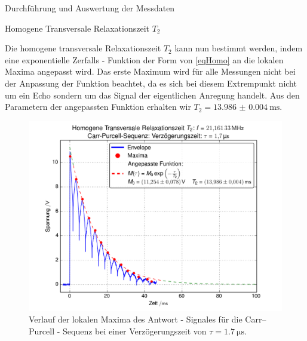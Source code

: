 \documentclass[pdftex, a4paper,11pt, twoside, ngerman]{report}
\begin{document}
\begin{chapter}{Durchführung und Auswertung der Messdaten}
\begin{section}{
        Homogene Transversale Relaxationszeit $T_{2}$}
\begin{subsection}
        Die homogene transversale Relaxationszeit $T_{2}$ kann nun bestimmt
        werden, indem eine exponentielle Zerfalls - Funktion der Form
        von \cref{eqHomo} an die lokalen Maxima angepasst wird.
        Das erste Maximum wird für alle Messungen nicht bei der Anpassung der
        Funktion beachtet, da es sich bei diesem Extrempunkt nicht um ein
        Echo sondern um das Signal der eigentlichen Anregung handelt.
        Aus den Parametern der angepassten Funktion erhalten wir
        $T_{2}=\SI{13.986(4)}{\milli\second}$.
        \begin{figure}[htb]
          \centering
          \includegraphics[width=\textwidth]
          {Figures/HomoTransRelax_Carr0.png}
          \caption{Verlauf der lokalen Maxima des Antwort - Signales für die
            Carr--Purcell - Sequenz bei einer Verzögerungszeit von
            $\tau = \SI{1.7}{\micro\second}$.}
          \label{figCarrBsp}
        \end{figure}
        

\end{subsection}
\end{section}
\end{chapter}
\end{document}
